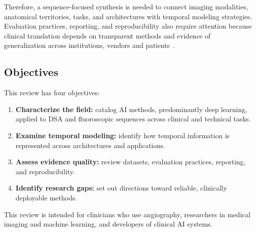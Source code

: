 Therefore, a sequence-focused synthesis is needed to connect imaging modalities, anatomical territories, tasks, and architectures with temporal modeling strategies. Evaluation practices, reporting, and reproducibility also require attention because clinical translation depends on transparent methods and evidence of generalization across institutions, vendors and patients~\cite{Tejani2024,collins2024tripod+}.



\subsection{Objectives}
\label{sec:intro-objectives}

This review has four objectives:

\begin{enumerate}[label=\textbf{O\arabic*.}, leftmargin=*, itemsep=4pt]
\item \textbf{Characterize the field:} catalog AI methods, predominantly deep learning, applied to DSA and fluoroscopic sequences across clinical and technical tasks.
\item \textbf{Examine temporal modeling:} identify how temporal information is represented across architectures and applications.
\item \textbf{Assess evidence quality:} review datasets, evaluation practices, reporting, and reproducibility.
\item \textbf{Identify research gaps:} set out directions toward reliable, clinically deployable methods.
\end{enumerate}

This review is intended for clinicians who use angiography, researchers in medical imaging and machine learning, and developers of clinical AI systems.

